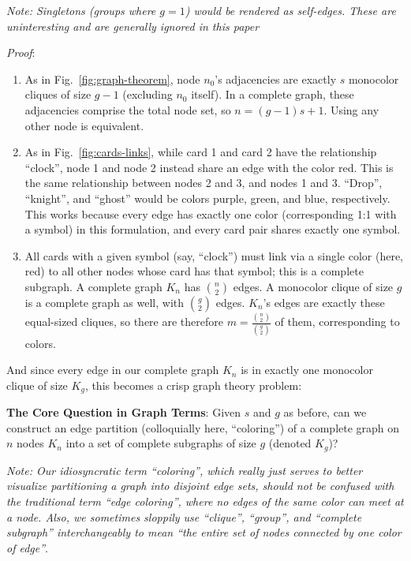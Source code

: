 \documentclass[11pt, oneside]{article} 	%
\begin{document}
\emph{Note: Singletons (groups where $g=1$) would be rendered as self-edges. These are uninteresting and are generally ignored in this paper}

\emph{Proof}:
\begin{enumerate}
\item As in Fig.~\ref{fig:graph-theorem}, node $n_0$'s adjacencies are exactly $s$ monocolor cliques of size $g-1$ (excluding $n_0$ itself). In a complete graph, these adjacencies comprise the total node set, so $n = (g-1)s + 1$. Using any other node is equivalent.
\item As in Fig.~\ref{fig:cards-links}, while card 1 and card 2 have the relationship ``clock'', node 1 and node 2 instead share an edge with the color red. This is the same relationship between nodes 2 and 3, and nodes 1 and 3. ``Drop'', ``knight'', and ``ghost'' would be colors purple, green, and blue, respectively. This works because every edge has exactly one color (corresponding 1:1 with a symbol) in this formulation, and every card pair shares exactly one symbol.
\item All cards with a given symbol (say, ``clock'') must link via a single color (here, red) to all other nodes whose card has that symbol; this is a complete subgraph. A complete graph $K_n$ has ${n \choose 2}$ edges. A monocolor clique of size $g$ is a complete graph as well, with ${g \choose 2}$ edges. $K_n$'s edges are exactly these equal-sized cliques, so there are therefore $m = \frac{{n \choose 2}}{{g \choose 2}}$ of them, corresponding to colors.
\end{enumerate}

And since every edge in our complete graph $K_n$ is in exactly one monocolor clique of size $K_g$, this becomes a crisp graph theory problem:

\begin{framed}
\textbf{The Core Question in Graph Terms}: Given $s$ and $g$ as before, can we construct an edge partition (colloquially here, ``coloring'') of a complete graph on $n$ nodes $K_n$ into a set of complete subgraphs of size $g$ (denoted $K_g$)?
\end{framed}

\emph{Note: Our idiosyncratic term ``coloring'', which really just serves to better visualize partitioning a graph into disjoint edge sets, should not be confused with the traditional term ``edge coloring'', where no edges of the same color can meet at a node. Also, we sometimes sloppily use ``clique'', ``group'', and ``complete subgraph'' interchangeably to mean ``the entire set of nodes connected by one color of edge''}.
\end{document}
